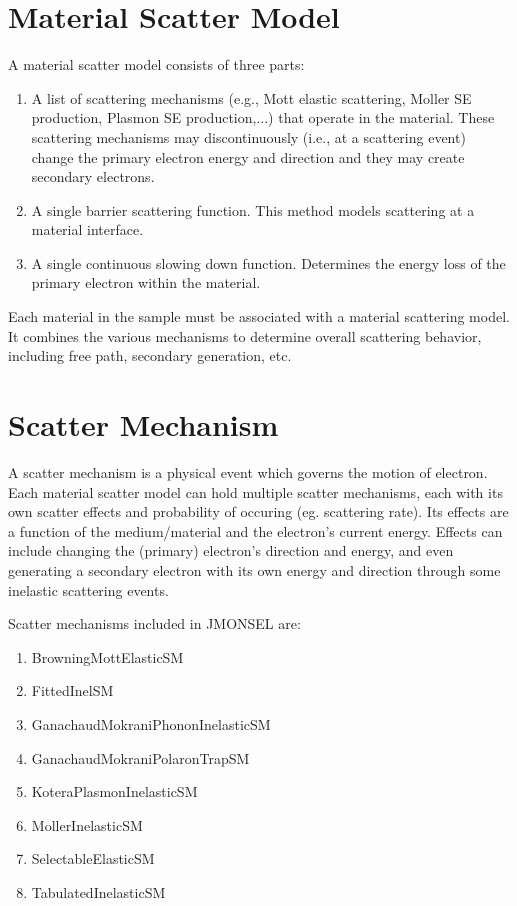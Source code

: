 \section{Material Scatter Model}\label{sec:msm}
A material scatter model consists of three parts:
\begin{enumerate}
\item A list of scattering mechanisms (e.g., Mott elastic scattering, Moller SE production, Plasmon SE production,...) that operate in the material. These scattering mechanisms may discontinuously (i.e., at a scattering event) change the primary electron energy and direction and they may create secondary electrons.
\item A single barrier scattering function. This method models scattering at a material interface.
\item A single continuous slowing down function. Determines the energy loss of the primary electron within the material. 
\end{enumerate}
Each material in the sample must be associated with a material scattering model. It combines the various mechanisms to determine overall scattering behavior, including free path, secondary generation, etc. 

\section{Scatter Mechanism}\label{sec:sm}
A scatter mechanism is a physical event which governs the motion of electron. Each material scatter model can hold multiple scatter mechanisms, each with its own scatter effects and probability of occuring (eg. scattering rate). Its effects are a function of the medium/material and the electron's current energy. Effects can include changing the (primary) electron's direction and energy, and even generating a secondary electron with its own energy and direction through some inelastic scattering events. 

Scatter mechanisms included in JMONSEL are:
\begin{enumerate}
\item BrowningMottElasticSM
\item FittedInelSM
\item GanachaudMokraniPhononInelasticSM
\item GanachaudMokraniPolaronTrapSM
\item KoteraPlasmonInelasticSM
\item MollerInelasticSM
\item SelectableElasticSM
\item TabulatedInelasticSM
\end{enumerate}
